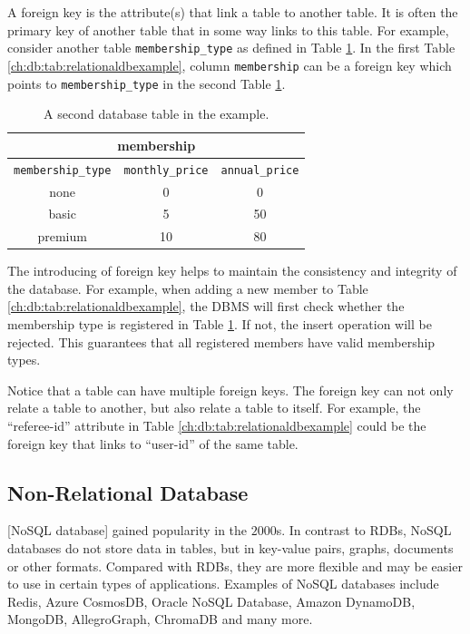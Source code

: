 A foreign key is the attribute(s) that link a table to another table. It is often the primary key of another table that in some way links to this table. For example, consider another table \verb|membership_type| as defined in Table \ref{ch:db:tab:relationaldbexampleanother}. In the first Table \ref{ch:db:tab:relationaldbexample}, column \verb|membership| can be a foreign key which points to \verb|membership_type| in the second Table \ref{ch:db:tab:relationaldbexampleanother}.

\begin{table}
	\centering \caption{A second database table in the example.} \label{ch:db:tab:relationaldbexampleanother}
	\begin{tabular}{|c|c|c|}
		\hline
		\multicolumn{3}{|c|}{membership} \\ \hline
		\verb|membership_type| & \verb|monthly_price| & \verb|annual_price| \\ \hline
		none & 0 & 0 \\ \hline
		basic & 5 & 50 \\ \hline
		premium & 10 & 80 \\ \hline
	\end{tabular}
\end{table}

The introducing of foreign key helps to maintain the consistency and integrity of the database. For example, when adding a new member to Table \ref{ch:db:tab:relationaldbexample}, the DBMS will first check whether the membership type is registered in Table \ref{ch:db:tab:relationaldbexampleanother}. If not, the insert operation will be rejected. This guarantees that all registered members have valid membership types.

Notice that a table can have multiple foreign keys. The foreign key can not only relate a table to another, but also relate a table to itself. For example, the ``referee-id'' attribute in Table \ref{ch:db:tab:relationaldbexample} could be the foreign key that links to ``user-id'' of the same table.

\subsection{Non-Relational Database}

[NoSQL database] gained popularity in the $2000$s. In contrast to RDBs, NoSQL databases do not store data in tables, but in key-value pairs, graphs, documents or other formats. Compared with RDBs, they are more flexible and may be easier to use in certain types of applications. Examples of NoSQL databases include Redis, Azure CosmosDB, Oracle NoSQL Database, Amazon DynamoDB, MongoDB, AllegroGraph, ChromaDB and many more.


